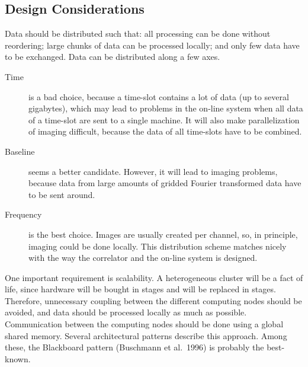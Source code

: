 \documentclass[11pt,twoside]{article}  %
\begin{document}
\subsection{Design Considerations}
Data should be distributed such that: all processing can be done without
reordering; large chunks of data can be processed locally; and only few data
have to be exchanged. Data can be distributed along a few axes.
\begin{description}
\item [Time] is a bad choice, because a time-slot contains a lot of data (up
to several gigabytes), which may lead to problems in the on-line system when
all data of a time-slot are sent to a single machine. It will also make
parallelization of imaging difficult, because the data of all time-slots have
to be combined.
\item [Baseline] seems a better candidate. However, it will lead to imaging
problems, because data from large amounts of gridded Fourier transformed data
have to be sent around.
\item [Frequency] is the best choice. Images are usually created per channel,
so, in principle, imaging could be done locally. This distribution scheme
matches nicely with the way the correlator and the on-line system is designed.
\end{description}

One important requirement is scalability. A heterogeneous cluster will be a
fact of life, since hardware will be bought in stages and will be replaced in
stages. Therefore, unnecessary coupling between the different computing nodes
should be avoided, and data should be processed locally as much as
possible. Communication between the computing nodes should be done using a
global shared memory. Several architectural patterns describe this
approach. Among these, the Blackboard pattern (Buschmann et al.\ 1996) is
probably the best-known.
\end{document}
